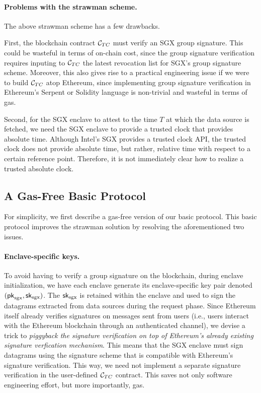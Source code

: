 \paragraph{Problems with the strawman scheme.}
The above strawman scheme has a few drawbacks. 

First, the blockchain contract
${\cal C}_{TC}$ must verify an SGX group signature.  
This could be wasteful in terms of on-chain cost, 
since the group signature verification requires inputing 
to ${\cal C}_{TC}$ the latest revocation list 
for SGX's group signature scheme.
Moreover, 
this also gives rise to a practical engineering issue if we
were 
to build ${\cal C}_{TC}$ atop Ethereum,
since implementing group signature verification in Ethereum's Serpent
or Solidity language is non-trivial and wasteful in terms of gas.

Second, for the SGX enclave to  
attest to the time $T$ at which the data source is fetched, 
we need the SGX enclave to provide a trusted clock that provides absolute time. 
Although Intel's SGX provides a 
trusted clock API, the trusted clock does not provide absolute time,
but rather, relative time with respect to a certain reference point.  
Therefore, it is not immediately clear how to realize 
a trusted absolute clock.

\subsection{A Gas-Free Basic Protocol}
For simplicity, we first describe a gas-free version of our basic protocol.
This basic protocol improves the strawman solution 
by resolving the aforementioned two issues.

\paragraph{Enclave-specific keys.}
To avoid having to verify a group signature on the blockchain,  
during enclave initialization, 
we have each enclave generate its enclave-specific 
key pair denoted $({\sf pk}_{\textrm{sgx}}, {\sf sk}_{\textrm{sgx}})$.
The ${\sf sk}_{\textrm{sgx}}$ is retained within the enclave and used
to sign the datagrams extracted from data sources during the request phase.
Since Ethereum itself 
already verifies signatures on messages sent from users (i.e.,
users interact with the 
Ethereum blockchain through an authenticated channel), 
we devise a trick to {\it piggyback the signature 
verification on top of Ethereum's already existing signature verfication mechanism}.
This means that the SGX enclave must sign datagrams using the 
signature scheme that is compatible with Ethereum's signature verification.
This way, we need not implement a separate signature verification
in the user-defined ${\cal C}_{TC}$ contract.
This saves 
not only software engineering effort, but more importantly, gas.

